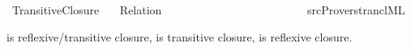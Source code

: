 %
\begin{isabellebody}%
%
%
\isadelimdocument
%
\endisadelimdocument
%
\isatagdocument
%
\isamarkuptrue%
%
\endisatagdocument
{\isafolddocument}%
%
\isadelimdocument
%
\endisadelimdocument
%
\isadelimtheory
%
\endisadelimtheory
%
\isatagtheory
{}\isamarkupfalse%
\ Transitive{\isacharunderscore}{\kern0pt}Closure\isanewline
\ \ \ Relation\isanewline
\ \ \ {\isachardoublequoteopen}{\isacharcircum}{\kern0pt}{\isacharasterisk}{\kern0pt}{\isachardoublequoteclose}\ {\isacharequal}{\kern0pt}\ {\isachardoublequoteopen}\isactrlsup {\isacharasterisk}{\kern0pt}{\isachardoublequoteclose}\ {\isachardoublequoteopen}\isactrlsup {\isacharasterisk}{\kern0pt}\isactrlsup {\isacharasterisk}{\kern0pt}{\isachardoublequoteclose}\isanewline
\ \ \ \ \ {\isachardoublequoteopen}{\isacharcircum}{\kern0pt}{\isacharplus}{\kern0pt}{\isachardoublequoteclose}\ {\isacharequal}{\kern0pt}\ {\isachardoublequoteopen}\isactrlsup {\isacharplus}{\kern0pt}{\isachardoublequoteclose}\ {\isachardoublequoteopen}\isactrlsup {\isacharplus}{\kern0pt}\isactrlsup {\isacharplus}{\kern0pt}{\isachardoublequoteclose}\isanewline
\ \ \ \ \ {\isachardoublequoteopen}{\isacharcircum}{\kern0pt}{\isacharequal}{\kern0pt}{\isachardoublequoteclose}\ {\isacharequal}{\kern0pt}\ {\isachardoublequoteopen}\isactrlsup {\isacharequal}{\kern0pt}{\isachardoublequoteclose}\ {\isachardoublequoteopen}\isactrlsup {\isacharequal}{\kern0pt}\isactrlsup {\isacharequal}{\kern0pt}{\isachardoublequoteclose}\isanewline
{}%
\endisatagtheory
{\isafoldtheory}%
%
\isadelimtheory
\isanewline
%
\endisadelimtheory
%
\isadelimML
\isanewline
%
\endisadelimML
%
\isatagML
{}\isamarkupfalse%
\ {\isacartoucheopen}{\isachartilde}{\kern0pt}{\isachartilde}{\kern0pt}{\isacharslash}{\kern0pt}src{\isacharslash}{\kern0pt}Provers{\isacharslash}{\kern0pt}trancl{\isachardot}{\kern0pt}ML{\isacartoucheclose}%
\endisatagML
{\isafoldML}%
%
\isadelimML
%
\endisadelimML
%
\begin{isamarkuptext}%
 is reflexive/transitive closure,
   is transitive closure,
   is reflexive closure.


\end{isamarkuptext}
\end{isabellebody}
